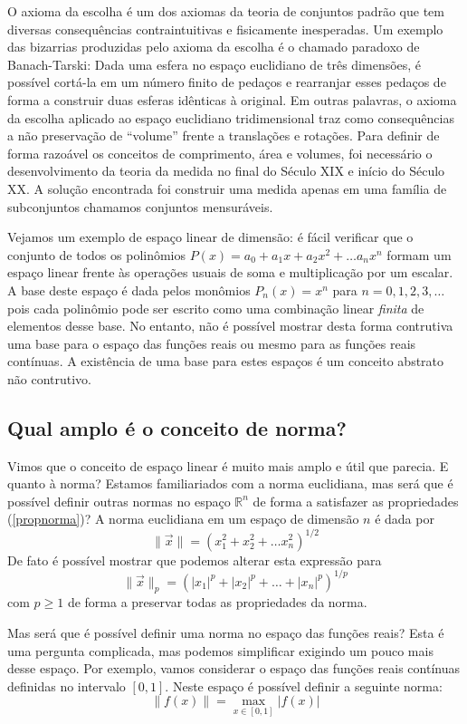 O axioma da escolha é um dos axiomas da teoria de conjuntos padrão que tem diversas consequências contraintuitivas e fisicamente inesperadas. Um exemplo das bizarrias produzidas pelo axioma da escolha é o chamado paradoxo de Banach-Tarski: Dada uma esfera no espaço euclidiano de três dimensões, é possível cortá-la em um número finito de pedaços e rearranjar esses pedaços de forma a construir duas esferas idênticas à original. Em outras palavras, o axioma da escolha aplicado ao espaço euclidiano tridimensional traz como consequências a não preservação de ``volume'' frente a translações e rotações. Para definir de forma razoável os conceitos de comprimento, área e volumes, foi necessário o desenvolvimento da teoria da medida no final do Século XIX e início do Século XX. A solução encontrada foi construir uma medida apenas em uma família de subconjuntos chamamos conjuntos mensuráveis.

Vejamos um exemplo de espaço linear de dimensão: é fácil verificar que o conjunto de todos os polinômios $P(x)=a_0+a_1x+a_2x^2+\ldots a_nx^n$ formam um espaço linear frente às operações usuais de soma e multiplicação por um escalar. A base deste espaço é dada pelos monômios $P_{n}(x)=x^n$ para $n=0,1,2,3,\ldots$ pois cada polinômio pode ser escrito como uma combinação linear \emph{finita} de elementos desse base. No entanto, não é possível mostrar desta forma contrutiva uma base para o espaço das funções reais ou mesmo para as funções reais contínuas. A existência de uma base para estes espaços é um conceito abstrato  não contrutivo.

\subsection{Qual amplo é o conceito de norma?}
Vimos que o conceito de espaço linear é muito mais amplo e útil que parecia. E quanto à norma? Estamos familiariados com a norma euclidiana, mas será que é possível definir outras normas no espaço $\mathbb{R}^n$ de forma a satisfazer as propriedades (\ref{propnorma})? A norma euclidiana em um espaço de dimensão $n$ é dada por
$$\|\vec{x}\|=\left(x_1^2+x_2^2+\ldots x_n^2\right)^{1/2}$$
De fato é possível mostrar que podemos alterar esta expressão para
$$\|\vec{x}\|_p=\left(|x_1|^p+|x_2|^p+\ldots +|x_n|^p\right)^{1/p}$$
com $p\geq 1$ de forma a preservar todas as propriedades da norma.

Mas será que é possível definir uma norma no espaço das funções reais? Esta é uma pergunta complicada, mas podemos simplificar exigindo um pouco mais desse espaço. Por exemplo, vamos considerar o espaço das funções reais contínuas definidas no intervalo $[0,1]$. Neste espaço é possível definir a seguinte norma:
\begin{equation}\label{norma_infinito}\|f(x)\|=\max_{x\in [0,1]}|f(x)|\end{equation}


